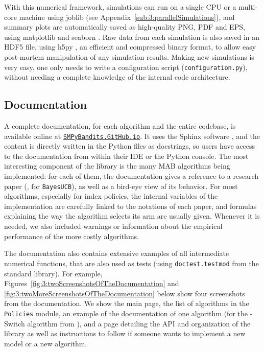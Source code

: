 With this numerical framework, simulations can run on a single CPU or a multi-core machine using joblib \cite{joblib} (see Appendix~\ref{sub:3:parallelSimulations}),
and summary plots are automatically saved as high-quality PNG, PDF and EPS, using matplotlib \cite{matplotlib} and seaborn \cite{seaborn}.
Raw data from each simulation is also saved in an HDF5 file, using h5py \cite{h5py}, an efficient and compressed binary format, to allow easy post-mortem manipulation of any simulation results.
Making new simulations is very easy, one only needs to write a configuration script (\texttt{configuration.py}), without needing a complete knowledge of the internal code architecture.


\subsection{Documentation}

A complete documentation, for each algorithm and the entire codebase, is available online at
\texttt{\href{https://SMPyBandits.GitHub.io}{SMPyBandits.GitHub.io}}.
It uses the Sphinx software \cite{sphinx}, and the content is directly written in the Python files as docstrings, so users have access to the documentation from within their IDE or the Python console.
The most interesting component of the library is the many MAB algorithms being implemented: for each of them, the documentation gives a reference to a research paper (\eg, \cite{Kaufmann12BUCB} for \texttt{BayesUCB}), as well as a bird-eye view of its behavior.
For most algorithms, especially for index policies, the internal variables of the implementation are carefully linked to the notations of each paper, and formulas explaining the way the algorithm selects its arm are usually given.
Whenever it is needed, we also included warnings or information about the empirical performance of the more costly algorithms.

The documentation also contains extensive examples of all intermediate numerical functions, that are also used as tests (using \texttt{doctest.testmod} from the standard library).
For example, Figures~\ref{fig:3:twoScreenshotsOfTheDocumentation} and \ref{fig:3:twoMoreScreenshotsOfTheDocumentation} below show four screenshots from the documentation.
We show the main page, the list of algorithms in the \texttt{Policies} module, an example of the documentation of one algorithm (for the \klUCB-Switch algorithm from \cite{GarivierHadiji2018}), and a page detailing the API and organization of the library as well as instructions to follow if someone wants to implement a new model or a new algorithm.


